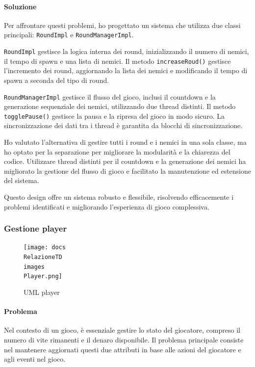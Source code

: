 \documentclass[a4paper,12pt]{report}
\begin{document}
\paragraph{Soluzione} Per affrontare questi problemi, ho progettato un sistema che utilizza due classi principali: \texttt{RoundImpl} e \texttt{RoundManagerImpl}.

\texttt{RoundImpl} gestisce la logica interna dei round, inizializzando il numero di nemici, il tempo di spawn e una lista di nemici. Il metodo \texttt{increaseRoud()} gestisce l'incremento dei round, aggiornando la lista dei nemici e modificando il tempo di spawn a seconda del tipo di round.

\texttt{RoundManagerImpl} gestisce il flusso del gioco, inclusi il countdown e la generazione sequenziale dei nemici, utilizzando due thread distinti. Il metodo \texttt{togglePause()} gestisce la pausa e la ripresa del gioco in modo sicuro. La sincronizzazione dei dati tra i thread è garantita da blocchi di sincronizzazione.

Ho valutato l'alternativa di gestire tutti i round e i nemici in una sola classe, ma ho optato per la separazione per migliorare la modularità e la chiarezza del codice. Utilizzare thread distinti per il countdown e la generazione dei nemici ha migliorato la gestione del flusso di gioco e facilitato la manutenzione ed estensione del sistema.

Questo design offre un sistema robusto e flessibile, risolvendo efficacemente i problemi identificati e migliorando l'esperienza di gioco complessiva.

\subsubsection{Gestione player}
\begin{figure}[H]
	\centering{}
	\texttt{[image: docs\\RelazioneTD\\images\\Player.png]}
	\caption{UML player}
	\label{img:Gui}
\end{figure}
\paragraph{Problema} Nel contesto di un gioco, è essenziale gestire lo stato del giocatore, compreso il numero di vite rimanenti e il denaro disponibile. Il problema principale consiste nel mantenere aggiornati questi due attributi in base alle azioni del giocatore e agli eventi nel gioco.
\end{document}
